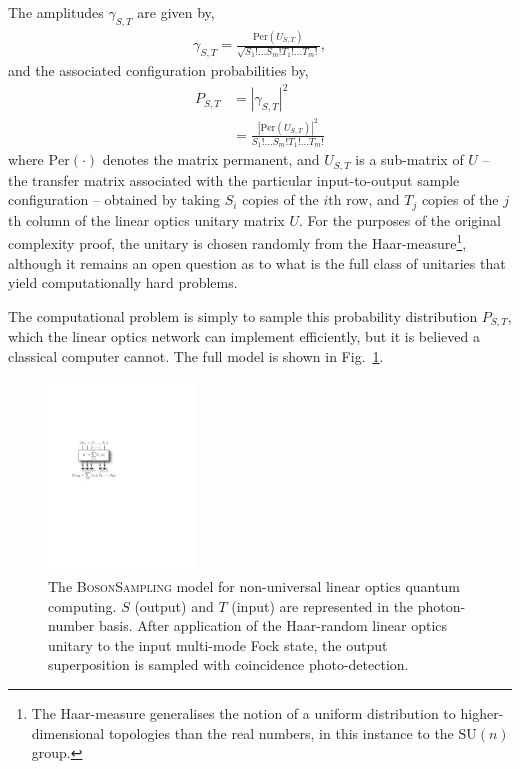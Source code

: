 The amplitudes $\gamma_{S,T}$ are given by,
\begin{align}
	\gamma_{S,T} = \frac{\text{Per}(U_{S,T})}{\sqrt{S_1!\dots S_m! T_1!\dots T_m!}},
\end{align}
and the associated configuration probabilities by,
\begin{align}
	P_{S,T} &= |\gamma_{S,T}|^2 \nonumber \\
	&= \frac{|\text{Per}(U_{S,T})|^2}{S_1!\dots S_m! T_1!\dots T_m!}
\end{align}
where $\text{Per}(\cdot)$ denotes the matrix permanent, and $U_{S,T}$ is a sub-matrix of $U$ -- the transfer matrix associated with the particular input-to-output sample configuration -- obtained by taking $S_i$ copies of the $i$th row, and $T_j$ copies of the $j$th column of the linear optics unitary matrix $U$. For the purposes of the original complexity proof, the unitary is chosen randomly from the Haar-measure\footnote{The Haar-measure generalises the notion of a uniform distribution to higher-dimensional topologies than the real numbers, in this instance to the $\text{SU}(n)$ group.}, although it remains an open question as to what is the full class of unitaries that yield computationally hard problems.

The computational problem is simply to sample this probability distribution $P_{S,T}$, which the linear optics network can implement efficiently, but it is believed a classical computer cannot. The full model is shown in Fig.~\ref{fig:bs_model}.

\begin{figure}[!htb]
\includegraphics[width=0.35\textwidth]{bs_model}
\caption{The \textsc{BosonSampling} model for non-universal linear optics quantum computing. $S$ (output) and $T$ (input) are represented in the photon-number basis. After application of the Haar-random linear optics unitary to the input multi-mode Fock state, the output superposition is sampled with coincidence photo-detection.} \label{fig:bs_model}
\end{figure}

